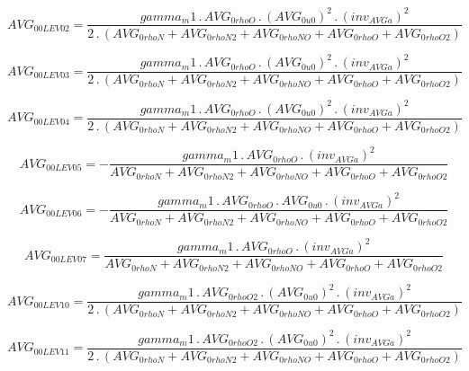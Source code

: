 \documentclass{article}
\begin{document}
\begin{dmath}AVG_{0 0 LEV 02} = \frac{gamma_m1 \,.\, AVG_{0 rhoO} \,.\, \left(AVG_{0 u0} \right)^{2} \,.\, \left(inv_{AVG a} \right)^{2}}{2 \,.\, \left(AVG_{0 rhoN} + AVG_{0 rhoN2} + AVG_{0 rhoNO} + AVG_{0 rhoO} + AVG_{0 rhoO2}\right)}\end{dmath}

\begin{dmath}AVG_{0 0 LEV 03} = \frac{gamma_m1 \,.\, AVG_{0 rhoO} \,.\, \left(AVG_{0 u0} \right)^{2} \,.\, \left(inv_{AVG a} \right)^{2}}{2 \,.\, \left(AVG_{0 rhoN} + AVG_{0 rhoN2} + AVG_{0 rhoNO} + AVG_{0 rhoO} + AVG_{0 rhoO2}\right)}\end{dmath}

\begin{dmath}AVG_{0 0 LEV 04} = \frac{gamma_m1 \,.\, AVG_{0 rhoO} \,.\, \left(AVG_{0 u0} \right)^{2} \,.\, \left(inv_{AVG a} \right)^{2}}{2 \,.\, \left(AVG_{0 rhoN} + AVG_{0 rhoN2} + AVG_{0 rhoNO} + AVG_{0 rhoO} + AVG_{0 rhoO2}\right)}\end{dmath}

\begin{dmath}AVG_{0 0 LEV 05} = - \frac{gamma_m1 \,.\, AVG_{0 rhoO} \,.\, \left(inv_{AVG a} \right)^{2}}{AVG_{0 rhoN} + AVG_{0 rhoN2} + AVG_{0 rhoNO} + AVG_{0 rhoO} + AVG_{0 rhoO2}}\end{dmath}

\begin{dmath}AVG_{0 0 LEV 06} = - \frac{gamma_m1 \,.\, AVG_{0 rhoO} \,.\, AVG_{0 u0} \,.\, \left(inv_{AVG a} \right)^{2}}{AVG_{0 rhoN} + AVG_{0 rhoN2} + AVG_{0 rhoNO} + AVG_{0 rhoO} + AVG_{0 rhoO2}}\end{dmath}

\begin{dmath}AVG_{0 0 LEV 07} = \frac{gamma_m1 \,.\, AVG_{0 rhoO} \,.\, \left(inv_{AVG a} \right)^{2}}{AVG_{0 rhoN} + AVG_{0 rhoN2} + AVG_{0 rhoNO} + AVG_{0 rhoO} + AVG_{0 rhoO2}}\end{dmath}

\begin{dmath}AVG_{0 0 LEV 10} = \frac{gamma_m1 \,.\, AVG_{0 rhoO2} \,.\, \left(AVG_{0 u0} \right)^{2} \,.\, \left(inv_{AVG a} \right)^{2}}{2 \,.\, \left(AVG_{0 rhoN} + AVG_{0 rhoN2} + AVG_{0 rhoNO} + AVG_{0 rhoO} + AVG_{0 rhoO2}\right)}\end{dmath}

\begin{dmath}AVG_{0 0 LEV 11} = \frac{gamma_m1 \,.\, AVG_{0 rhoO2} \,.\, \left(AVG_{0 u0} \right)^{2} \,.\, \left(inv_{AVG a} \right)^{2}}{2 \,.\, \left(AVG_{0 rhoN} + AVG_{0 rhoN2} + AVG_{0 rhoNO} + AVG_{0 rhoO} + AVG_{0 rhoO2}\right)}\end{dmath}
\end{document}
